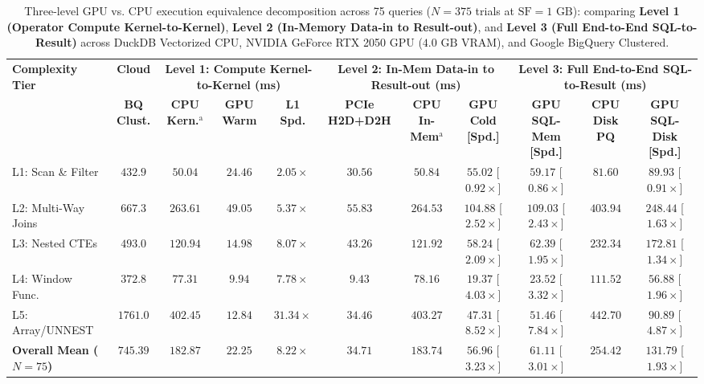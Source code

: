 \documentclass[10pt,a4paper]{article}
\newenvironment{fitasttable}{%
  \begin{lrbox}{\asttblbox}%
}{%
  \end{lrbox}%
  \sbox{\asttblboxB}{%
    \ifdim\wd\asttblbox>0.96\textwidth
      \resizebox{0.96\textwidth}{!}{\usebox{\asttblbox}}%
    \else
      \usebox{\asttblbox}%
    \fi
  }%
  \ifdim\ht\asttblboxB>0.72\textheight
    \resizebox{!}{0.72\textheight}{\usebox{\asttblboxB}}%
  \else
    \usebox{\asttblboxB}%
  \fi
}
\begin{document}
\begin{table}[!htbp]
\centering
\caption{Three-level GPU vs. CPU execution equivalence decomposition across 75 queries ($N=375$ trials at $\text{SF}=1\text{ GB}$): comparing \textbf{Level 1 (Operator Compute Kernel-to-Kernel)}, \textbf{Level 2 (In-Memory Data-in to Result-out)}, and \textbf{Level 3 (Full End-to-End SQL-to-Result)} across DuckDB Vectorized CPU, NVIDIA GeForce RTX 2050 GPU ($4.0\text{ GB}$ VRAM), and Google BigQuery Clustered.}\label{tab:jbd_gpu_3level_t4}
\label{tab:gpu_pcie_decomposition}
\scriptsize
\setlength{\tabcolsep}{3.2pt}
\renewcommand{\arraystretch}{1.12}
\begin{fitasttable}
\begin{tabular}{@{}lcccccccccc@{}}
\toprule
\multirow{2}{*}{\textbf{Complexity Tier}} & \textbf{Cloud} & \multicolumn{3}{c}{\textbf{Level 1: Compute Kernel-to-Kernel (ms)}} & \multicolumn{3}{c}{\textbf{Level 2: In-Mem Data-in to Result-out (ms)}} & \multicolumn{3}{c}{\textbf{Level 3: Full End-to-End SQL-to-Result (ms)}} \\
\cmidrule(lr){2-2} \cmidrule(lr){3-5} \cmidrule(lr){6-8} \cmidrule(lr){9-11}
 & \textbf{BQ Clust.} & \textbf{CPU Kern.$^{\text{a}}$} & \textbf{GPU Warm} & \textbf{L1 Spd.} & \textbf{PCIe H2D+D2H} & \textbf{CPU In-Mem$^{\text{a}}$} & \textbf{GPU Cold [Spd.]} & \textbf{GPU SQL-Mem [Spd.]} & \textbf{CPU Disk PQ} & \textbf{GPU SQL-Disk [Spd.]} \\
\midrule
L1: Scan \& Filter & $432.9$ & $50.04$ & $24.46$ & $2.05\times$ & $30.56$ & $50.84$ & $55.02$ [$0.92\times$] & $59.17$ [$0.86\times$] & $81.60$ & $89.93$ [$0.91\times$] \\
L2: Multi-Way Joins & $667.3$ & $263.61$ & $49.05$ & $5.37\times$ & $55.83$ & $264.53$ & $104.88$ [$2.52\times$] & $109.03$ [$2.43\times$] & $403.94$ & $248.44$ [$1.63\times$] \\
L3: Nested CTEs & $493.0$ & $120.94$ & $14.98$ & $8.07\times$ & $43.26$ & $121.92$ & $58.24$ [$2.09\times$] & $62.39$ [$1.95\times$] & $232.34$ & $172.81$ [$1.34\times$] \\
L4: Window Func. & $372.8$ & $77.31$ & $9.94$ & $7.78\times$ & $9.43$ & $78.16$ & $19.37$ [$4.03\times$] & $23.52$ [$3.32\times$] & $111.52$ & $56.88$ [$1.96\times$] \\
L5: Array/UNNEST & $1761.0$ & $402.45$ & $12.84$ & $31.34\times$ & $34.46$ & $403.27$ & $47.31$ [$8.52\times$] & $51.46$ [$7.84\times$] & $442.70$ & $90.89$ [$4.87\times$] \\
\midrule
\textbf{Overall Mean ($N=75$)} & $\mathbf{745.39}$ & $\mathbf{182.87}$ & $\mathbf{22.25}$ & $\mathbf{8.22\times}$ & $\mathbf{34.71}$ & $\mathbf{183.74}$ & $\mathbf{56.96}$ [$\mathbf{3.23\times}$] & $\mathbf{61.11}$ [$\mathbf{3.01\times}$] & $\mathbf{254.42}$ & $\mathbf{131.79}$ [$\mathbf{1.93\times}$] \\

\end{tabular}
\end{fitasttable}
\end{table}
\end{document}
